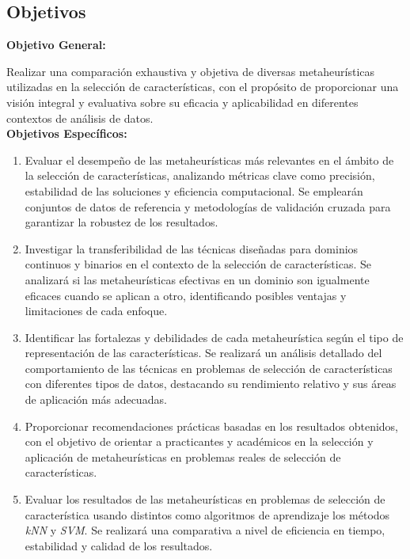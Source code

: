 \subsection{Objetivos}
\textbf{Objetivo General:}

Realizar una comparación exhaustiva y objetiva de diversas metaheurísticas utilizadas en la
selección de características, con el propósito de proporcionar una visión integral y
evaluativa sobre su eficacia y aplicabilidad en diferentes contextos de análisis de
datos.\\[6pt]
\textbf{Objetivos Específicos:}

\begin{enumerate}
      \item Evaluar el desempeño de las metaheurísticas más relevantes en el ámbito de la
            selección de características, analizando métricas clave como precisión, estabilidad de
            las soluciones y eficiencia computacional. Se emplearán conjuntos de datos de referencia
            y metodologías de validación cruzada para garantizar la robustez de los resultados.

      \item Investigar la transferibilidad de las técnicas diseñadas para dominios continuos y
            binarios en el contexto de la selección de características. Se analizará si las
            metaheurísticas efectivas en un dominio son igualmente eficaces cuando se aplican a
            otro, identificando posibles ventajas y limitaciones de cada enfoque.

      \item Identificar las fortalezas y debilidades de cada metaheurística según el tipo de
            representación de las características. Se realizará un análisis detallado del
            comportamiento de las técnicas en problemas de selección de características con
            diferentes tipos de datos, destacando su rendimiento relativo y sus áreas de aplicación
            más adecuadas.

      \item Proporcionar recomendaciones prácticas basadas en los resultados obtenidos, con el
            objetivo de orientar a practicantes y académicos en la selección y aplicación de
            metaheurísticas en problemas reales de selección de características.

      \item Evaluar los resultados de las metaheurísticas en problemas de selección de característica
            usando distintos como algoritmos de aprendizaje los métodos \textit{kNN} y \textit{SVM}. Se realizará
            una comparativa a nivel de eficiencia en tiempo, estabilidad y calidad de los resultados.
\end{enumerate}

